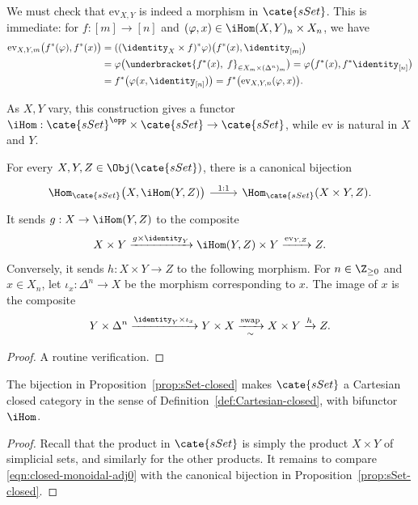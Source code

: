 We must check that $\mathrm{ev}_{X,Y}$ is indeed a morphism in
$\cate{sSet}$. This is immediate: for $f:[m]\to[n]$ and
$(\varphi,x)\in\iHom(X,Y)_n\times X_n$, we have
\begin{align*}
	\mathrm{ev}_{X,Y,m}\bigl(f^*(\varphi),f^*(x)\bigr)
	&=((\identity_X\times f)^*\varphi)
	  \bigl(f^*(x),\identity_{[m]}\bigr)\\
	&=\varphi\bigl(
	  \underbracket{f^*(x),\;f}_{\in X_m\times(\Delta^n)_m}\bigr)
	 =\varphi\bigl(f^*(x),f^*\identity_{[n]}\bigr)\\
	&=f^*\bigl(\varphi(x,\identity_{[n]})\bigr)
	 =f^*\bigl(\mathrm{ev}_{X,Y,n}(\varphi,x)\bigr).
\end{align*}

As $X,Y$ vary, this construction gives a functor
$\iHom:\cate{sSet}^{\opp}\times\cate{sSet}\to\cate{sSet}$, while
$\mathrm{ev}$ is natural in $X$ and $Y$.

\begin{proposition}\label{prop:sSet-closed}
	For every $X,Y,Z\in\Obj(\cate{sSet})$, there is a canonical bijection
	\[\begin{tikzcd}
		\Hom_{\cate{sSet}}\bigl(X,\iHom(Y,Z)\bigr)
		\arrow[r,"1:1"]
		&\Hom_{\cate{sSet}}(X\times Y,Z).
	\end{tikzcd}\]
	It sends $g:X\to\iHom(Y,Z)$ to the composite
	\[
	X\times Y\xrightarrow{g\times\identity_Y}
	\iHom(Y,Z)\times Y\xrightarrow{\mathrm{ev}_{Y,Z}}Z.
	\]
	Conversely, it sends $h:X\times Y\to Z$ to the following morphism. For
	$n\in\Z_{\geq0}$ and $x\in X_n$, let $\iota_x:\Delta^n\to X$ be the
	morphism corresponding to $x$. The image of $x$ is the composite
	\[
	Y\times\Delta^n\xrightarrow{\identity_Y\times\iota_x}Y\times X
	\xrightarrow[\sim]{\text{swap}}X\times Y\xrightarrow{h}Z.
	\]
\end{proposition}
\begin{proof}
	A routine verification.
\end{proof}

\begin{corollary}
	The bijection in Proposition~\ref{prop:sSet-closed} makes $\cate{sSet}$
	a Cartesian closed category in the sense of
	Definition~\ref{def:Cartesian-closed}, with bifunctor $\iHom$.
\end{corollary}
\begin{proof}
	Recall that the product in $\cate{sSet}$ is simply the product
	$X\times Y$ of simplicial sets, and similarly for the other products.
	It remains to compare \eqref{eqn:closed-monoidal-adj0} with the canonical
	bijection in Proposition~\ref{prop:sSet-closed}.
\end{proof}

